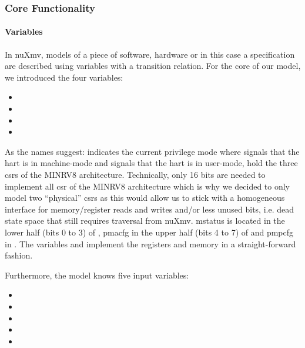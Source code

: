 
\subsubsection{Core Functionality}

\paragraph{Variables}
In nuXmv, models of a piece of software, hardware or in this case a specification are described using variables with a transition relation.
For the core of our model, we introduced the four variables:
\begin{itemize}
    \item {}
    \item {}
    \item {}
    \item {}
\end{itemize}

As the names suggest:  indicates the current privilege mode where  signals that the \gls{hart} is in machine-mode and  signals that the \gls{hart} is in user-mode,  hold the three \glspl{csr} of the MINRV8 architecture.
Technically, only 16 bits are needed to implement all \gls{csr} of the MINRV8 architecture which is why we decided to only model two \enquote{physical} \glspl{csr} as this would allow us to stick with a homogeneous interface for memory/register reads and writes and/or less unused bits, i.e. dead state space that still requires traversal from nuXmv.
\gls{mstatus} is located in the lower half (bits 0 to 3) of , \gls{pmacfg} in the upper half (bits 4 to 7) of  and \gls{pmpcfg} in .
The variables  and  implement the registers and memory in a straight-forward fashion.

Furthermore, the model knows five input variables:
\begin{itemize}
    \item {}
    \item {}
    \item {}
    \item {}
    \item {}
\end{itemize}

